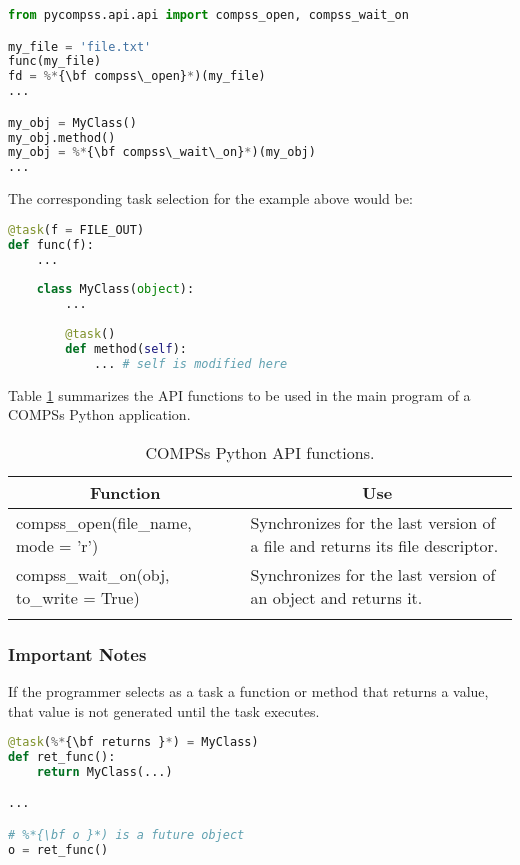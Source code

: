 \begin{lstlisting}[language=python]
from pycompss.api.api import compss_open, compss_wait_on

my_file = 'file.txt'
func(my_file)
fd = %*{\bf compss\_open}*)(my_file)
...

my_obj = MyClass()
my_obj.method()
my_obj = %*{\bf compss\_wait\_on}*)(my_obj)
...
\end{lstlisting}

The corresponding task selection for the example above would be:

\begin{lstlisting}[language=python]
@task(f = FILE_OUT)
def func(f):
    ...
    
    class MyClass(object):
        ...
        
        @task()
        def method(self):
            ... # self is modified here
\end{lstlisting}

Table \ref{tab:python_api_functions} summarizes the API functions to be used in the main program of a COMPSs Python application.
\bgroup
  \def\arraystretch{1.5}%
  \begin{longtable}{| p{} | p{} |}
    \hline
    \multicolumn{1}{|c|}{{\bf Function }}    &  \multicolumn{1}{c|}{{\bf Use }}\\
    \hline
    compss\_open(file\_name, mode = 'r') & Synchronizes for the last version of a file and returns its file descriptor. \\
    \hline
    compss\_wait\_on(obj, to\_write = True) & Synchronizes for the last version of an object and returns it. \\
    \hline
    \caption{COMPSs Python API functions.}
    \label{tab:python_api_functions}
  \end{longtable}
\egroup

\subsubsection{Important Notes}

If the programmer selects as a task a function or method that returns a value, that value is not 
generated until the task executes. 

\begin{lstlisting}[language=python]
@task(%*{\bf returns }*) = MyClass)
def ret_func():
    return MyClass(...)

...

# %*{\bf o }*) is a future object
o = ret_func()
\end{lstlisting}

